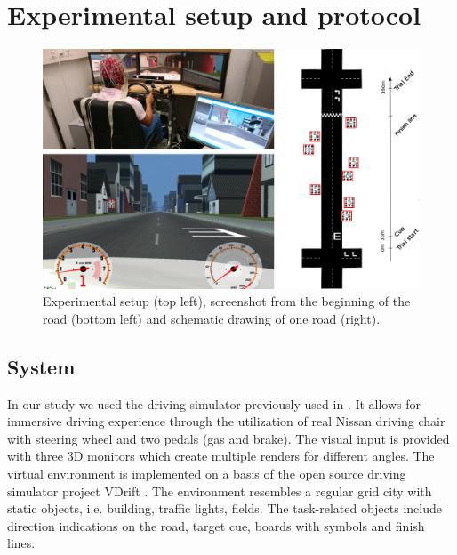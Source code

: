 \documentclass[12pt]{iopart}
\begin{document}
\section{Experimental setup and protocol}
\label{sec:protocol}


\begin{figure}[!t]
    \includegraphics[trim={0cm 0cm 0cm 0cm},clip,width=0.8\columnwidth]{../images/setup_protocol2.png}
    \caption{Experimental setup (top left), screenshot from the beginning of the road (bottom left)
    and schematic drawing of one road (right).}
\label{fig:setup}
\end{figure}

\subsection{System}
In our study we used the driving simulator previously used in
\cite{khaliliardali_action_2015,zhang_eeg-based_2015,renold_eeg_2014}.
It allows for immersive driving experience through the utilization
of real Nissan driving chair with steering wheel and two pedals (gas and brake).
The visual input is provided with three 3D monitors which create multiple renders for
different angles. The virtual environment is implemented on a basis of
the open source driving simulator project VDrift \cite{noauthor_about_nodate}.
The environment resembles a regular grid city with static objects, i.e.
building, traffic lights, fields. The task-related objects include
direction indications on the road, target cue, boards with symbols
and finish lines. 
\end{document}
